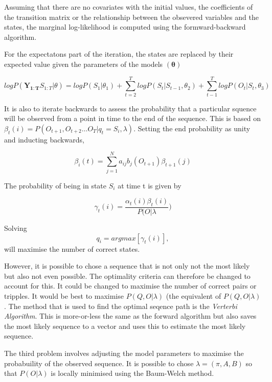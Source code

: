 \documentclass[12pt, a4paper, oneside]{article} %
\begin{document}
Assuming that there are no covariates with the initial values, the coefficients of the transition matrix or the relationship between the obsevered variables and the states, the marginal log-likelihood is computed using the formward-backward algorithm.

For the expectatons part of the iteration, the states are replaced by their expected value given the parameters of the models $(\mathbf{\theta})$

\begin{equation} 
log P(\mathbf{Y_{1:T}}S_{1:T}| \theta) = log P(S_1|\theta_1) + \sum_{t=2}^T log P(S_t|S_{t-1}, \theta_2) + \sum_{t-1}^T log P(O_t|S_t, \theta_3)
\end{equation}

It is also to iterate backwards to assess the probability that a particular squence will be observed from a point in time to the end of the sequence.  This is based on $\beta_t(i) = P(O_{t+1}, O_{t+2}\dots O_T| q_t = S_i, \lambda)$. Setting the end probability as unity and inducting backwards, 

\begin{equation} 
\beta_i(t) = \sum_{j = 1}^N a_{ij}b_j(O_{t+1})\beta_{t+1}(j)
\end{equation}

The probability of being in state $S_i$ at time t is given by 

\begin{equation}
\gamma_t(i) = \frac{\alpha_t(i)\beta_t(i)}{P(O|\lambda})
\end{equation}

Solving
\begin{equation}
q_i = argmax [\gamma_t(i)], %
\end{equation}
will maximise the number of correct states. 

However, it is possible to chose a sequence that is not only not the most likely but also not even possible.  The optimality criteria can therefore be changed to account for this.  It could be changed to maximise the number of correct pairs or tripples. It would be best to maximise $P(Q, O |\lambda)$ (the equivalent of $P(Q, O| \lambda)$.  The method that is used to find the optimal seqence path is the \emph{Verterbi Algorithm}.  This is more-or-less the same as the forward algorithm but also saves the most likely sequence to a vector and uses this to estimate the most likely sequence. 

The third problem involves adjusting the model parameters to maximise the probabuility of the observed sequence. It is possible to chose $\lambda = (\pi, A, B)$ so that $P(O|\lambda)$ is locally minimised using the Baum-Welch method. 
\end{document}

